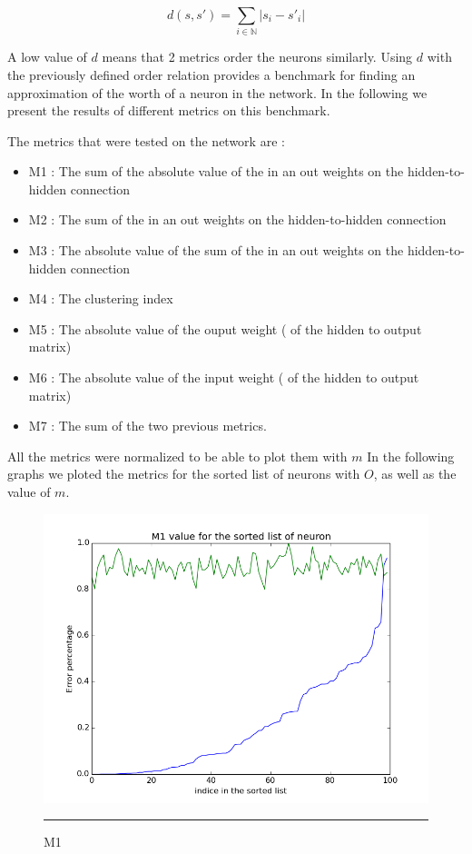 $$ d(s , s') =  \sum_{i \in \mathbb{N}} {| s_i - s'_i|} $$

A low value of $d$ means that 2 metrics order the neurons similarly. Using $d$ with the previously defined order relation provides a benchmark for finding an approximation of the worth of a neuron in the network. In the following we present the results of different metrics on this benchmark.

The metrics that were tested on the network are : 
\begin{itemize}
    \item M1 : The sum of the absolute value of the in an out weights on the hidden-to-hidden connection
    \item M2 : The sum of the in an out weights on the hidden-to-hidden connection
    \item M3 : The absolute value of the sum of the in an out weights on the hidden-to-hidden connection
    \item M4 : The clustering index
    \item M5 : The absolute value of the ouput weight ( of the hidden to output matrix) 
    \item M6 : The absolute value of the input weight ( of the hidden to output matrix) 
    \item M7 : The sum of the two previous metrics.
\end{itemize}

All the metrics were normalized to be able to plot them with $m$
In the following graphs we ploted the metrics for the sorted list of neurons with $O$, as well as the value of $m$. 


\begin{figure}[htbp]
    \centering
    \includegraphics[scale=0.5]{Figures/m1.png}
    \rule{35em}{0.5pt}
    \caption[M1]{M1}
    \label{fig:m1}
\end{figure}


